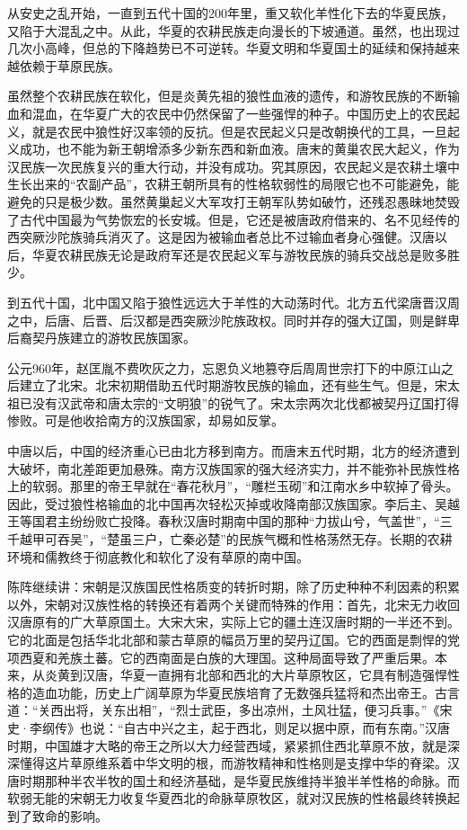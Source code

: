 \par 从安史之乱开始，一直到五代十国的200年里，重又软化羊性化下去的华夏民族，又陷于大混乱之中。从此，华夏的农耕民族走向漫长的下坡通道。虽然，也出现过几次小高峰，但总的下降趋势已不可逆转。华夏文明和华夏国土的延续和保持越来越依赖于草原民族。
\par 虽然整个农耕民族在软化，但是炎黄先祖的狼性血液的遗传，和游牧民族的不断输血和混血，在华夏广大的农民中仍然保留了一些强悍的种子。中国历史上的农民起义，就是农民中狼性好汉率领的反抗。但是农民起义只是改朝换代的工具，一旦起义成功，也不能为新王朝增添多少新东西和新血液。唐末的黄巢农民大起义，作为汉民族一次民族复兴的重大行动，并没有成功。究其原因，农民起义是农耕土壤中生长出来的“农副产品”，农耕王朝所具有的性格软弱性的局限它也不可能避免，能避免的只是极少数。虽然黄巢起义大军攻打王朝军队势如破竹，还残忍愚昧地焚毁了古代中国最为气势恢宏的长安城。但是，它还是被唐政府借来的、名不见经传的西突厥沙陀族骑兵消灭了。这是因为被输血者总比不过输血者身心强健。汉唐以后，华夏农耕民族无论是政府军还是农民起义军与游牧民族的骑兵交战总是败多胜少。
\par 到五代十国，北中国又陷于狼性远远大于羊性的大动荡时代。北方五代梁唐晋汉周之中，后唐、后晋、后汉都是西突厥沙陀族政权。同时并存的强大辽国，则是鲜卑后裔契丹族建立的游牧民族国家。
\par 公元960年，赵匡胤不费吹灰之力，忘恩负义地篡夺后周周世宗打下的中原江山之后建立了北宋。北宋初期借助五代时期游牧民族的输血，还有些生气。但是，宋太祖已没有汉武帝和唐太宗的“文明狼”的锐气了。宋太宗两次北伐都被契丹辽国打得惨败。可是他收拾南方的汉族国家，却易如反掌。
\par 中唐以后，中国的经济重心已由北方移到南方。而唐末五代时期，北方的经济遭到大破坏，南北差距更加悬殊。南方汉族国家的强大经济实力，并不能弥补民族性格上的软弱。那里的帝王早就在“春花秋月”，“雕栏玉砌”和江南水乡中软掉了骨头。因此，受过狼性格输血的北中国再次轻松灭掉或收降南部汉族国家。李后主、吴越王等国君主纷纷败亡投降。春秋汉唐时期南中国的那种“力拔山兮，气盖世”，“三千越甲可吞吴”，“楚虽三户，亡秦必楚”的民族气概和性格荡然无存。长期的农耕环境和儒教终于彻底教化和软化了没有草原的南中国。
\par 
\par 陈阵继续讲：宋朝是汉族国民性格质变的转折时期，除了历史种种不利因素的积累以外，宋朝对汉族性格的转换还有着两个关键而特殊的作用：首先，北宋无力收回汉唐原有的广大草原国土。大宋大宋，实际上它的疆土连汉唐时期的一半还不到。它的北面是包括华北北部和蒙古草原的幅员万里的契丹辽国。它的西面是剽悍的党项西夏和羌族土蕃。它的西南面是白族的大理国。这种局面导致了严重后果。本来，从炎黄到汉唐，华夏一直拥有北部和西北的大片草原牧区，它具有制造强悍性格的造血功能，历史上广阔草原为华夏民族培育了无数强兵猛将和杰出帝王。古言道：“关西出将，关东出相”，“烈士武臣，多出凉州，土风壮猛，便习兵事。”《宋史·李纲传》也说：“自古中兴之主，起于西北，则足以据中原，而有东南。”汉唐时期，中国雄才大略的帝王之所以大力经营西域，紧紧抓住西北草原不放，就是深深懂得这片草原维系着中华文明的根，而游牧精神和性格则是支撑中华的脊梁。汉唐时期那种半农半牧的国土和经济基础，是华夏民族维持半狼半羊性格的命脉。而软弱无能的宋朝无力收复华夏西北的命脉草原牧区，就对汉民族的性格最终转换起到了致命的影响。
